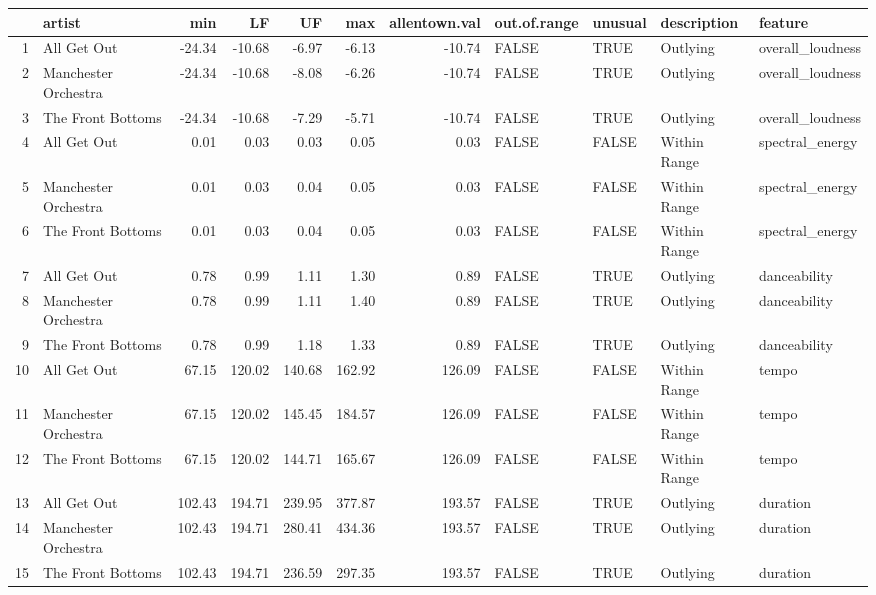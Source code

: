 \begin{table}[ht]
\centering
\begin{tabular}{rlrrrrrllll}
  \hline
 & artist & min & LF & UF & max & allentown.val & out.of.range & unusual & description & feature \\ 
  \hline
1 & All Get Out & -24.34 & -10.68 & -6.97 & -6.13 & -10.74 & FALSE & TRUE & Outlying & overall\_loudness \\ 
  2 & Manchester Orchestra & -24.34 & -10.68 & -8.08 & -6.26 & -10.74 & FALSE & TRUE & Outlying & overall\_loudness \\ 
  3 & The Front Bottoms & -24.34 & -10.68 & -7.29 & -5.71 & -10.74 & FALSE & TRUE & Outlying & overall\_loudness \\ 
  4 & All Get Out & 0.01 & 0.03 & 0.03 & 0.05 & 0.03 & FALSE & FALSE & Within Range & spectral\_energy \\ 
  5 & Manchester Orchestra & 0.01 & 0.03 & 0.04 & 0.05 & 0.03 & FALSE & FALSE & Within Range & spectral\_energy \\ 
  6 & The Front Bottoms & 0.01 & 0.03 & 0.04 & 0.05 & 0.03 & FALSE & FALSE & Within Range & spectral\_energy \\ 
  7 & All Get Out & 0.78 & 0.99 & 1.11 & 1.30 & 0.89 & FALSE & TRUE & Outlying & danceability \\ 
  8 & Manchester Orchestra & 0.78 & 0.99 & 1.11 & 1.40 & 0.89 & FALSE & TRUE & Outlying & danceability \\ 
  9 & The Front Bottoms & 0.78 & 0.99 & 1.18 & 1.33 & 0.89 & FALSE & TRUE & Outlying & danceability \\ 
  10 & All Get Out & 67.15 & 120.02 & 140.68 & 162.92 & 126.09 & FALSE & FALSE & Within Range & tempo \\ 
  11 & Manchester Orchestra & 67.15 & 120.02 & 145.45 & 184.57 & 126.09 & FALSE & FALSE & Within Range & tempo \\ 
  12 & The Front Bottoms & 67.15 & 120.02 & 144.71 & 165.67 & 126.09 & FALSE & FALSE & Within Range & tempo \\ 
  13 & All Get Out & 102.43 & 194.71 & 239.95 & 377.87 & 193.57 & FALSE & TRUE & Outlying & duration \\ 
  14 & Manchester Orchestra & 102.43 & 194.71 & 280.41 & 434.36 & 193.57 & FALSE & TRUE & Outlying & duration \\ 
  15 & The Front Bottoms & 102.43 & 194.71 & 236.59 & 297.35 & 193.57 & FALSE & TRUE & Outlying & duration \\ 

\end{tabular}
\end{table}
